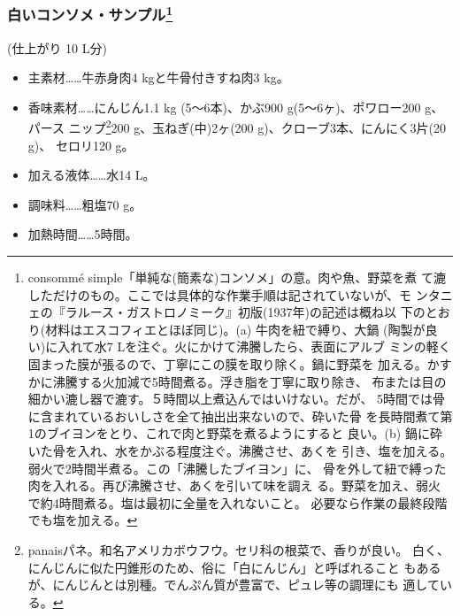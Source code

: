 \begin{recette}
\hypertarget{ux767dux3044ux30b3ux30f3ux30bdux30e1ux30b5ux30f3ux30d7ux30eb1}{%
\subsubsection[白いコンソメ・サンプル]{\texorpdfstring{白いコンソメ・サンプル\footnote{consommé
  simple「単純な(簡素な)コンソメ」の意。肉や魚、野菜を煮
  て漉しただけのもの。ここでは具体的な作業手順は記されていないが、モ
  ンタニェの『ラルース・ガストロノミーク』初版(1937年)の記述は概ね以
  下のとおり(材料はエスコフィエとほぼ同じ)。(a) 牛肉を紐で縛り、大鍋
  (陶製が良い)に入れて水7 Lを注ぐ。火にかけて沸騰したら、表面にアルブ
  ミンの軽く固まった膜が張るので、丁寧にこの膜を取り除く。鍋に野菜を
  加える。かすかに沸騰する火加減で5時間煮る。浮き脂を丁寧に取り除き、
  布または目の細かい漉し器で漉す。５時間以上煮込んではいけない。だが、
  5時間では骨に含まれているおいしさを全て抽出出来ないので、砕いた骨
  を長時間煮て第1のブイヨンをとり、これで肉と野菜を煮るようにすると
  良い。(b) 鍋に砕いた骨を入れ、水をかぶる程度注ぐ。沸騰させ、あくを
  引き、塩を加える。弱火で2時間半煮る。この「沸騰したブイヨン」に、
  骨を外して紐で縛った肉を入れる。再び沸騰させ、あくを引いて味を調え
  る。野菜を加え、弱火で約4時間煮る。塩は最初に全量を入れないこと。
  必要なら作業の最終段階でも塩を加える。}}{白いコンソメ・サンプル}}\label{ux767dux3044ux30b3ux30f3ux30bdux30e1ux30b5ux30f3ux30d7ux30eb1}}

(仕上がり 10 L分)

\begin{itemize}
\item
  主素材\ldots{}\ldots{}牛赤身肉4 kgと牛骨付きすね肉3 kg。
\item
  香味素材\ldots{}\ldots{}にんじん1.1 kg (5〜6本)、かぶ900
  g(5〜6ヶ)、ポワロー200 g、パース ニップ\footnote{panaisパネ。和名アメリカボウフウ。セリ科の根菜で、香りが良い。
    白く、にんじんに似た円錐形のため、俗に「白にんじん」と呼ばれること
    もあるが、にんじんとは別種。でんぷん質が豊富で、ピュレ等の調理にも
    適している。}200 g、玉ねぎ(中)2ヶ(200
  g)、クローブ3本、にんにく3片(20 g)、 セロリ120 g。
\item
  加える液体\ldots{}\ldots{}水14 L。
\item
  調味料\ldots{}\ldots{}粗塩70 g。
\item
  加熱時間\ldots{}\ldots{}5時間。
\end{itemize}

\hypertarget{ux4f5cux308aux65b9ux306bux95a2ux3059ux308bux88dcux8db33}{%
}
\end{recette}
